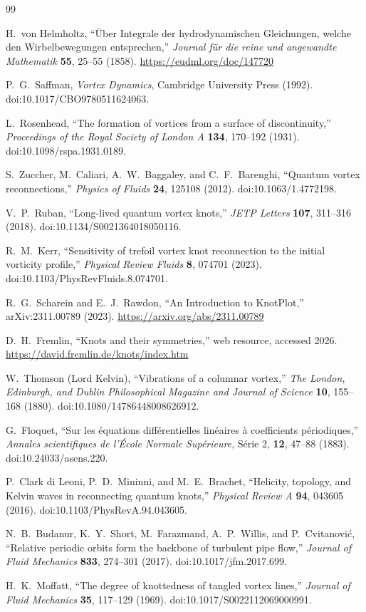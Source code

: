 \begin{thebibliography}{99}

H.~von Helmholtz,
``Über Integrale der hydrodynamischen Gleichungen, welche den Wirbelbewegungen entsprechen,''
\emph{Journal für die reine und angewandte Mathematik} \textbf{55}, 25--55 (1858).
\url{https://eudml.org/doc/147720}

P.~G.~Saffman,
\emph{Vortex Dynamics},
Cambridge University Press (1992).
doi:10.1017/CBO9780511624063.

L.~Rosenhead,
``The formation of vortices from a surface of discontinuity,''
\emph{Proceedings of the Royal Society of London A} \textbf{134}, 170--192 (1931).
doi:10.1098/rspa.1931.0189.

S.~Zuccher, M.~Caliari, A.~W.~Baggaley, and C.~F.~Barenghi,
``Quantum vortex reconnections,''
\emph{Physics of Fluids} \textbf{24}, 125108 (2012).
doi:10.1063/1.4772198.

V.~P.~Ruban,
``Long-lived quantum vortex knots,''
\emph{JETP Letters} \textbf{107}, 311--316 (2018).
doi:10.1134/S0021364018050116.

R.~M.~Kerr,
``Sensitivity of trefoil vortex knot reconnection to the initial vorticity profile,''
\emph{Physical Review Fluids} \textbf{8}, 074701 (2023).
doi:10.1103/PhysRevFluids.8.074701.

R.~G.~Scharein and E.~J.~Rawdon,
``An Introduction to KnotPlot,''
arXiv:2311.00789 (2023).
\url{https://arxiv.org/abs/2311.00789}

D.~H.~Fremlin,
``Knots and their symmetries,''
web resource, accessed 2026.
\url{https://david.fremlin.de/knots/index.htm}


W.~Thomson (Lord Kelvin),
``Vibrations of a columnar vortex,''
\emph{The London, Edinburgh, and Dublin Philosophical Magazine and Journal of Science} \textbf{10}, 155--168 (1880).
doi:10.1080/14786448008626912.

G.~Floquet,
``Sur les équations différentielles linéaires à coefficients périodiques,''
\emph{Annales scientifiques de l'École Normale Supérieure}, Série 2, \textbf{12}, 47--88 (1883).
doi:10.24033/asens.220.

P.~Clark di Leoni, P.~D.~Mininni, and M.~E.~Brachet,
``Helicity, topology, and Kelvin waves in reconnecting quantum knots,''
\emph{Physical Review A} \textbf{94}, 043605 (2016).
doi:10.1103/PhysRevA.94.043605.

N.~B.~Budanur, K.~Y.~Short, M.~Farazmand, A.~P.~Willis, and P.~Cvitanović,
``Relative periodic orbits form the backbone of turbulent pipe flow,''
\emph{Journal of Fluid Mechanics} \textbf{833}, 274--301 (2017).
doi:10.1017/jfm.2017.699.


H.~K.~Moffatt,
``The degree of knottedness of tangled vortex lines,''
\emph{Journal of Fluid Mechanics} \textbf{35}, 117--129 (1969).
doi:10.1017/S0022112069000991.

\end{thebibliography}
